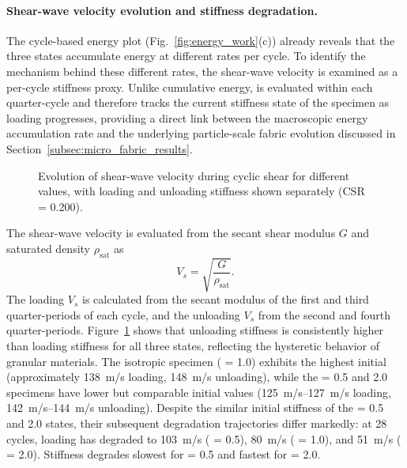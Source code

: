 \paragraph{Shear-wave velocity evolution and stiffness degradation.}
The cycle-based energy plot (Fig.~\ref{fig:energy_work}(c)) already reveals that the three \Kzero{} states accumulate energy at different rates per cycle. To identify the mechanism behind these different rates, the shear-wave velocity \Vs{} is examined as a per-cycle stiffness proxy. Unlike cumulative energy, \Vs{} is evaluated within each quarter-cycle and therefore tracks the current stiffness state of the specimen as loading progresses, providing a direct link between the macroscopic energy accumulation rate and the underlying particle-scale fabric evolution discussed in Section~\ref{subsec:micro_fabric_results}.

\begin{figure}
  \centering
  \caption{Evolution of shear-wave velocity during cyclic shear for different \Kzero{} values, with loading and unloading stiffness shown separately (CSR = 0.200).}
  \label{fig:vs_evolution}
\end{figure}

The shear-wave velocity is evaluated from the secant shear modulus $G$ and saturated density $\rho_{\mathrm{sat}}$ as \citep{XuLing2015}
\begin{equation}
V_s = \sqrt{\frac{G}{\rho_{\mathrm{sat}}}}.
\label{eq:vs_definition}
\end{equation}
The loading $V_s$ is calculated from the secant modulus of the first and third quarter-periods of each cycle, and the unloading $V_s$ from the second and fourth quarter-periods. Figure~\ref{fig:vs_evolution} shows that unloading stiffness is consistently higher than loading stiffness for all three states, reflecting the hysteretic behavior of granular materials. The isotropic specimen (\Kzero{} = 1.0) exhibits the highest initial \Vs{} (approximately \SI{138}{m/s} loading, \SI{148}{m/s} unloading), while the \Kzero{} = 0.5 and 2.0 specimens have lower but comparable initial values (\SIrange{125}{127}{m/s} loading, \SIrange{142}{144}{m/s} unloading). Despite the similar initial stiffness of the \Kzero{} = 0.5 and 2.0 states, their subsequent degradation trajectories differ markedly: at 28 cycles, loading \Vs{} has degraded to \SI{103}{m/s} (\Kzero{} = 0.5), \SI{80}{m/s} (\Kzero{} = 1.0), and \SI{51}{m/s} (\Kzero{} = 2.0). Stiffness degrades slowest for \Kzero{} = 0.5 and fastest for \Kzero{} = 2.0.

